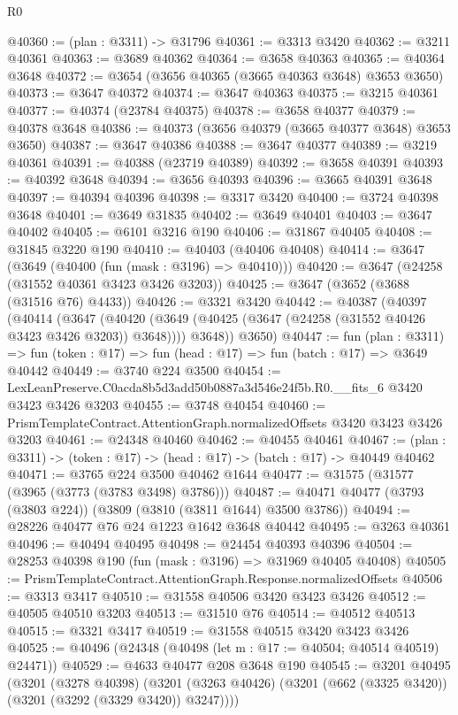 \begin{lexlean}{R0}
\begin{coremodule}
@40360 := (plan : @3311) -> @31796
@40361 := @3313 @3420
@40362 := @3211 @40361
@40363 := @3689 @40362
@40364 := @3658 @40363
@40365 := @40364 @3648
@40372 := @3654 (@3656 @40365 (@3665 @40363 @3648) @3653 @3650)
@40373 := @3647 @40372
@40374 := @3647 @40363
@40375 := @3215 @40361
@40377 := @40374 (@23784 @40375)
@40378 := @3658 @40377
@40379 := @40378 @3648
@40386 := @40373 (@3656 @40379 (@3665 @40377 @3648) @3653 @3650)
@40387 := @3647 @40386
@40388 := @3647 @40377
@40389 := @3219 @40361
@40391 := @40388 (@23719 @40389)
@40392 := @3658 @40391
@40393 := @40392 @3648
@40394 := @3656 @40393
@40396 := @3665 @40391 @3648
@40397 := @40394 @40396
@40398 := @3317 @3420
@40400 := @3724 @40398 @3648
@40401 := @3649 @31835
@40402 := @3649 @40401
@40403 := @3647 @40402
@40405 := @6101 @3216 @190
@40406 := @31867 @40405
@40408 := @31845 @3220 @190
@40410 := @40403 (@40406 @40408)
@40414 := @3647 (@3649 (@40400 (fun (mask : @3196) => @40410)))
@40420 := @3647 (@24258 (@31552 @40361 @3423 @3426 @3203))
@40425 := @3647 (@3652 (@3688 (@31516 @76) @4433))
@40426 := @3321 @3420
@40442 := @40387
    (@40397
      (@40414
        (@3647
          (@40420 (@3649 (@40425 (@3647 (@24258 (@31552 @40426 @3423 @3426 @3203)) @3648))))
          @3648))
      @3650)
@40447 := fun (plan : @3311) =>
  fun (token : @17) => fun (head : @17) => fun (batch : @17) => @3649 @40442
@40449 := @3740 @224 @3500
@40454 := LexLeanPreserve.C0acda8b5d3add50b0887a3d546e24f5b.R0.__fits_6 @3420 @3423 @3426 @3203
@40455 := @3748 @40454
@40460 := PrismTemplateContract.AttentionGraph.normalizedOffsets @3420 @3423 @3426 @3203
@40461 := @24348 @40460
@40462 := @40455 @40461
@40467 := (plan : @3311) -> (token : @17) -> (head : @17) -> (batch : @17) -> @40449 @40462
@40471 := @3765 @224 @3500 @40462 @1644
@40477 := @31575 (@31577 (@3965 (@3773 (@3783 @3498) @3786)))
@40487 := @40471 @40477 (@3793 (@3803 @224)) (@3809 (@3810 (@3811 @1644) @3500 @3786))
@40494 := @28226 @40477 @76 @24 @1223 @1642 @3648 @40442
@40495 := @3263 @40361
@40496 := @40494 @40495
@40498 := @24454 @40393 @40396
@40504 := @28253 @40398 @190 (fun (mask : @3196) => @31969 @40405 @40408)
@40505 := PrismTemplateContract.AttentionGraph.Response.normalizedOffsets
@40506 := @3313 @3417
@40510 := @31558 @40506 @3420 @3423 @3426
@40512 := @40505 @40510 @3203
@40513 := @31510 @76
@40514 := @40512 @40513
@40515 := @3321 @3417
@40519 := @31558 @40515 @3420 @3423 @3426
@40525 := @40496 (@24348 (@40498 (let m : @17 := @40504; @40514 @40519) @24471))
@40529 := @4633 @40477 @208 @3648 @190
@40545 := @3201
    @40495
    (@3201
      (@3278 @40398)
      (@3201 (@3263 @40426) (@3201 (@662 (@3325 @3420)) (@3201 (@3292 (@3329 @3420)) @3247))))

\end{coremodule}
\end{lexlean}
